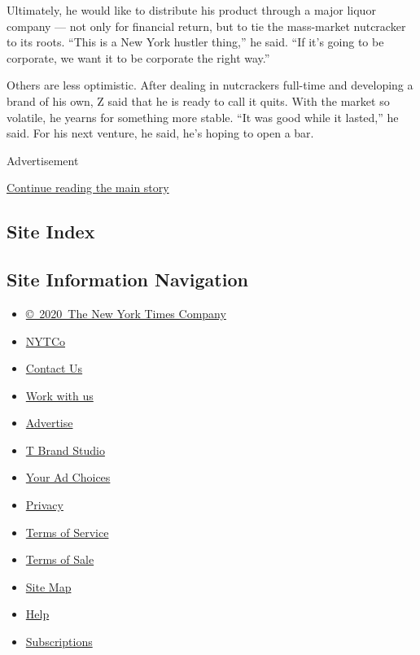 Ultimately, he would like to distribute his product through a major
liquor company --- not only for financial return, but to tie the
mass-market nutcracker to its roots. ``This is a New York hustler
thing,'' he said. ``If it's going to be corporate, we want it to be
corporate the right way.''

Others are less optimistic. After dealing in nutcrackers full-time and
developing a brand of his own, Z said that he is ready to call it quits.
With the market so volatile, he yearns for something more stable. ``It
was good while it lasted,'' he said. For his next venture, he said, he's
hoping to open a bar.

Advertisement

\protect\hyperlink{after-bottom}{Continue reading the main story}

\hypertarget{site-index}{%
\subsection{Site Index}\label{site-index}}

\hypertarget{site-information-navigation}{%
\subsection{Site Information
Navigation}\label{site-information-navigation}}

\begin{itemize}
\tightlist
\item
  \href{https://help.nytimes3xbfgragh.onion/hc/en-us/articles/115014792127-Copyright-notice}{©~2020~The
  New York Times Company}
\end{itemize}

\begin{itemize}
\tightlist
\item
  \href{https://www.nytco.com/}{NYTCo}
\item
  \href{https://help.nytimes3xbfgragh.onion/hc/en-us/articles/115015385887-Contact-Us}{Contact
  Us}
\item
  \href{https://www.nytco.com/careers/}{Work with us}
\item
  \href{https://nytmediakit.com/}{Advertise}
\item
  \href{http://www.tbrandstudio.com/}{T Brand Studio}
\item
  \href{https://www.nytimes3xbfgragh.onion/privacy/cookie-policy\#how-do-i-manage-trackers}{Your
  Ad Choices}
\item
  \href{https://www.nytimes3xbfgragh.onion/privacy}{Privacy}
\item
  \href{https://help.nytimes3xbfgragh.onion/hc/en-us/articles/115014893428-Terms-of-service}{Terms
  of Service}
\item
  \href{https://help.nytimes3xbfgragh.onion/hc/en-us/articles/115014893968-Terms-of-sale}{Terms
  of Sale}
\item
  \href{https://spiderbites.nytimes3xbfgragh.onion}{Site Map}
\item
  \href{https://help.nytimes3xbfgragh.onion/hc/en-us}{Help}
\item
  \href{https://www.nytimes3xbfgragh.onion/subscription?campaignId=37WXW}{Subscriptions}
\end{itemize}
